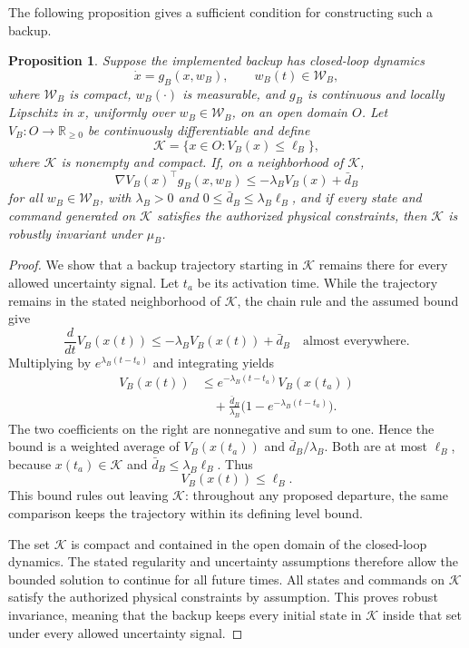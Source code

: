 \documentclass[preprint,12pt]{elsarticle}
\newtheorem{proposition}{Proposition}
\begin{document}
The following proposition gives a sufficient condition for constructing such
a backup.

\begin{proposition}
\label{prop:backup-lyapunov}
Suppose the implemented backup has closed-loop dynamics
\[
\dot x=g_B(x,w_B),\qquad w_B(t)\in\mathcal W_B,
\]
where $\mathcal W_B$ is compact, $w_B(\cdot)$ is measurable, and $g_B$ is
continuous and locally Lipschitz in $x$, uniformly over
$w_B\in\mathcal W_B$, on an open domain $O$. Let
$V_B:O\rightarrow\mathbb R_{\ge0}$ be continuously differentiable and define
\[
\mathcal K=\{x\in O:V_B(x)\le\ell_B\},
\]
where $\mathcal K$ is nonempty and compact. If, on a neighborhood of
$\mathcal K$,
\[
\nabla V_B(x)^\top g_B(x,w_B)
\le -\lambda_B V_B(x)+\bar d_B
\]
for all $w_B\in\mathcal W_B$, with
$\lambda_B>0$ and
$0\le\bar d_B\le\lambda_B\ell_B$, and if every state and command generated
on $\mathcal K$ satisfies the authorized physical constraints, then
$\mathcal K$ is robustly invariant under $\mu_B$.
\end{proposition}

\begin{proof}
We show that a backup trajectory starting in $\mathcal K$ remains there
for every allowed uncertainty signal. Let $t_a$ be its activation time.
While the trajectory remains in the stated neighborhood of $\mathcal K$,
the chain rule and the assumed bound give
\[
 \frac{d}{dt}V_B(x(t))
 \le-\lambda_B V_B(x(t))+\bar d_B
 \quad\text{almost everywhere}.
\]
Multiplying by $e^{\lambda_B(t-t_a)}$ and integrating yields
\[
\begin{aligned}
 V_B(x(t))
 &\le e^{-\lambda_B(t-t_a)}V_B(x(t_a))\\
 &\quad+
 \frac{\bar d_B}{\lambda_B}
 \bigl(1-e^{-\lambda_B(t-t_a)}\bigr).
\end{aligned}
\]
The two coefficients on the right are nonnegative and sum to one.
Hence the bound is a weighted average of $V_B(x(t_a))$ and
$\bar d_B/\lambda_B$. Both are at most $\ell_B$, because
$x(t_a)\in\mathcal K$ and $\bar d_B\le\lambda_B\ell_B$. Thus
\[
 V_B(x(t))\le\ell_B.
\]
This bound rules out leaving $\mathcal K$: throughout any proposed
departure, the same comparison keeps the trajectory within its defining
level bound.

The set $\mathcal K$ is compact and contained in the open domain of the
closed-loop dynamics. The stated regularity and uncertainty assumptions
therefore allow the bounded solution to continue for all future times.
All states and commands on $\mathcal K$ satisfy the authorized physical
constraints by assumption. This proves robust invariance, meaning that
the backup keeps every initial state in $\mathcal K$ inside that set under
every allowed uncertainty signal.
\end{proof}
\end{document}
